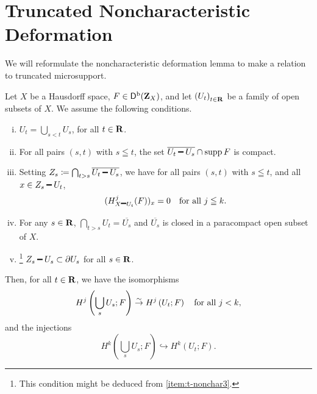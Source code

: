 \section{Truncated Noncharacteristic Deformation}

We will reformulate the noncharacteristic deformation 
lemma \cite[Proposition 2.7.2]{KS90} to make a relation 
to truncated microsupport. 

\begin{Proposition+}\label{prop:t-nonchar}
  Let \(X\) be a Hausdorff space, \(F\in\mathop{\mathsf{D}^\mathrm{b}}\nolimits(\mathbf{Z}_X)\), and 
  let \(\left(U_{t}\right)_{t\in\mathbf{R}}\) be a family of 
  open subsets of \(X\). 
  We assume the following conditions. 
  \begin{enumerate}[(i)]
    \item \label{item:t-nonchar1}
    \(U_{t}=\bigcup_{s<t}U_{s}\), for all \(t\in\mathbf{R}\). 
    \item \label{item:t-nonchar2}
    For all pairs \((s,t)\) with \(s\leqq t\), 
    the set \(\overline{U_{t}\smi U_{s}}\cap \supp{F}\) is compact.
    \item \label{item:t-nonchar3}
    Setting \(
      Z_{s}\coloneqq \bigcap_{t>s}\overline{U_t\smi U_s}
    \), we have for all pairs \((s,t)\) with \(s\leqq t\), 
    and all \(x\in Z_{s}\smi U_{t}\), \[
      (H^{j}_{X\smi U_{t}}(F))_{x}=0
      \quad 
      \text{for all \(j\leqq k\).}
    \]
    \item \label{item:t-nonchar4} 
    For any \(s\in\mathbf{R}\), 
    \(\bigcap_{t>s}U_{t}=\overline{U_{s}}\) 
    and 
    \(\overline{U_{s}}\) is closed 
    in a paracompact open subset of \(X\).
    \item\footnote{
      This condition might be 
      deduced from \eqref{item:t-nonchar3}.
    } \label{item:t-nonchar5} 
    \(Z_s\smi U_{s}\subset\bd{U_{s}}\) 
    for all \(s\in\mathbf{R}\). 
  \end{enumerate}
  Then, for all \(t\in\mathbf{R}\), we have the isomorphisms\[
    H^{j}\left(\bigcup_{s}U_{s};F\right)
    \mathrel{\overset{\sim}{\rightarrow}} 
    H^{j}\left(U_{t};F\right)
    \quad \text{for all \(j< k\),} 
  \]
  and the injections\[
    H^{k}\left(\bigcup_{s}U_{s};F\right)
    \hookrightarrow 
    H^{k}\left(U_{t};F\right).
  \] 
\end{Proposition+}

